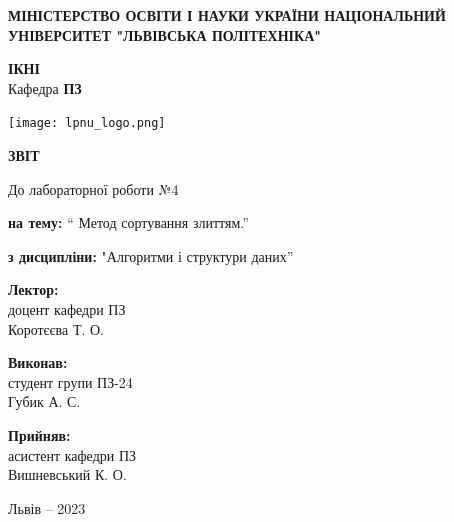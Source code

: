 \documentclass[12pt]{extarticle}
\begin{document}
\begin{titlepage}
    \begin{center}
        \textbf{\normalsize{\MakeUppercase{
            Міністерство Освіти і науки України
            Національний університет "Львівська політехніка"
        }}}

        \begin{flushright}
        \textbf{ІКНІ}\\
        Кафедра \textbf{ПЗ}
        \end{flushright}
        \vspace{15mm}

        \texttt{[image: lpnu\_logo.png]}

        \vspace*{\fill}

        \textbf{\normalsize{\MakeUppercase{Звіт}}}
            
        До лабораторної роботи №4

        \textbf{на тему:} “ Метод сортування злиттям.”

        \textbf{з дисципліни:} "Алгоритми і структури даних”
            
        \vspace*{\fill}

        \begin{flushright}

            \textbf{Лектор:}\\
            доцент кафедри ПЗ\\
            Коротєєва Т. О.\\
            \vspace{12pt}

            \textbf{Виконав:}\\
            студент групи ПЗ-24\\
            Губик А. С.\\
            \vspace{12pt}

            \textbf{Прийняв:}\\
            асистент кафедри ПЗ\\
            Вишневський К. О.\\
        \vspace{12pt}
        \end{flushright}

        Львів -- 2023
            
            
    \end{center}
\end{titlepage}
\end{document}

